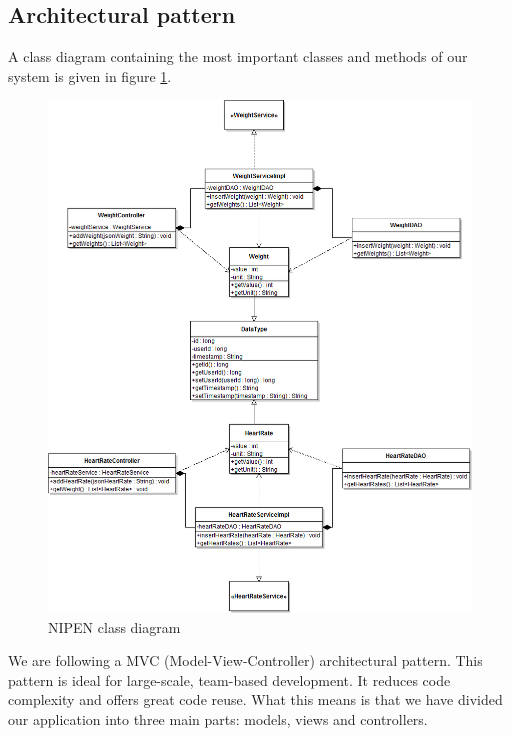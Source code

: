
\subsection{Architectural pattern}

A class diagram containing the most important classes and methods of our system is given in figure \ref{figure:nipen-class-diagram}.

\begin{figure}[h]
\centering
\includegraphics[scale=0.5]{../Figures/NIPEN-class-diagram.png}
\caption{NIPEN class diagram}
\label{figure:nipen-class-diagram}
\end{figure}

We are following a MVC (Model-View-Controller) architectural pattern. 
This pattern is ideal for large-scale, team-based development.
It reduces code complexity and offers great code reuse. 
What this means is that we have divided our application into three main parts: models, views and controllers.

